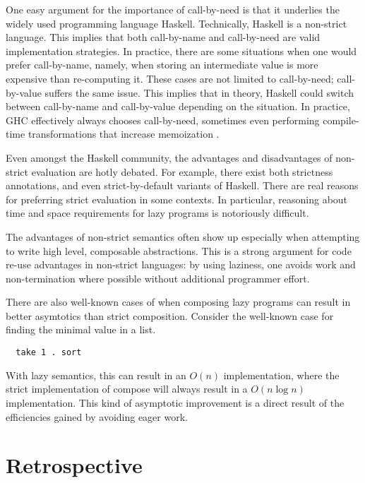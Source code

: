 One easy argument for the importance of call-by-need is that it underlies the
widely used programming language Haskell. Technically, Haskell is a non-strict
language.  This implies that both call-by-name and call-by-need are valid
implementation strategies. In practice, there are some situations when one would
prefer call-by-name, namely, when storing an intermediate value is more
expensive than re-computing it. These cases are not limited to call-by-need;
call-by-value suffers the same issue.  This implies that in theory, Haskell
could switch between call-by-name and call-by-value depending on the situation.
In practice, GHC effectively always chooses call-by-need, sometimes even
performing compile-time transformations that increase memoization
\cite{jones96floating}.  

Even amongst the Haskell community, the advantages and disadvantages of
non-strict evaluation are hotly debated. For example, there exist both
strictness annotations, and even strict-by-default variants of Haskell. There
are real reasons for preferring strict evaluation in some contexts. In
particular, reasoning about time and space requirements for lazy programs is
notoriously difficult.  

The advantages of non-strict semantics often show up especially when attempting
to write high level, composable abstractions. This is a strong argument for code
re-use advantages in non-strict languages: by using laziness, one avoids work
and non-termination where possible without additional programmer effort.

There are also well-known cases of when composing lazy programs can result in
better asymtotics than strict composition. Consider the well-known case for
finding the minimal value in a list. 
\begin{verbatim}
  take 1 . sort
\end{verbatim}
With lazy semantics, this can result in an $O(n)$ implementation, where the
strict implementation of compose will always result in a $O(n \log n)$
implementation. This kind of asymptotic improvement is a direct result of the
efficiencies gained by avoiding eager work. 

\section{Retrospective}

